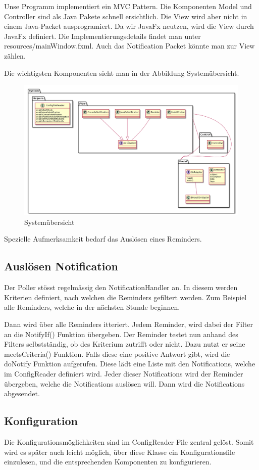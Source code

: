 Unse Programm implementiert ein MVC Pattern. Die Komponenten Model und Controller sind als Java Pakete schnell ersichtlich. Die View wird aber nicht in einem Java-Packet  ausprogramiert. Da wir JavaFx neutzen, wird die View durch JavaFx definiert. Die Implementierungsdetails findet man unter resources/mainWindow.fxml. Auch das Notification Packet könnte man zur View zählen.

Die wichtigsten Komponenten sieht man in der Abbildung Systemübersicht.
\begin{landscape}
\begin{figure}
  \centering
    \includegraphics[width=1\textwidth]{../uml/uebersicht01.png}
  \caption{Systemübersicht}
  \label{fig:overview}
\end{figure}
\end{landscape}

Spezielle Aufmerksamkeit bedarf das Auslösen eines Reminders.
\subsection{Auslösen Notification}

Der Poller stösst regelmässig den NotificationHandler an.
In diesem werden Kriterien definiert, nach welchen die Reminders gefiltert werden.  Zum Beispiel alle Reminders, welche in der nächsten Stunde beginnen.



Dann wird über alle Reminders itteriert. Jedem Reminder, wird dabei der Filter an die NotifyIf() Funktion übergeben.
Der Reminder testet nun anhand des Filters selbstständig, ob des Kriterium zutrifft oder nicht. Dazu nutzt er seine meetsCriteria() Funktion.
Falls diese eine positive Antwort gibt, wird die doNotify Funktion aufgerufen. Diese lädt eine Liste mit den Notifications, welche im ConfigReader definiert wird. Jeder dieser Notifications wird der Reminder übergeben, welche die Notifications auslösen will. Dann wird die Notifications abgesendet.

\subsection{Konfiguration}
Die Konfigurationsmöglichkeiten sind im ConfigReader File zentral gelöst. Somit wird es später auch leicht möglich, über diese Klasse ein Konfigurationsfile  einzulesen, und die entsprechenden Komponenten zu konfigurieren.
